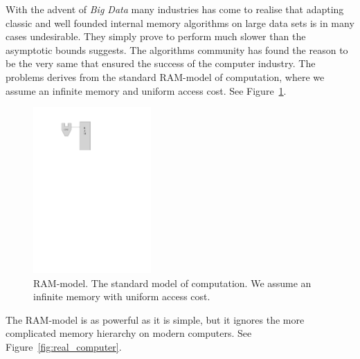 \documentclass[twoside,11pt,openright]{report}
\begin{document}
With the advent of \textit{Big Data} many industries has come to realise that adapting classic and well founded internal memory algorithms on large data sets is in many cases undesirable. 
They simply prove to perform much slower than the asymptotic bounds suggests. The algorithms community has found the reason to be the very same that ensured the success of the computer industry. The problems derives from the standard RAM-model of computation, where we assume an infinite memory and uniform access cost. See Figure~\ref{fig:ram_model}.

\begin{figure}
\captionsetup{width=0.40\textwidth}
	\centering
		\includegraphics[width=0.4\textwidth]{../figures/ram_model}
	\caption{RAM-model. The standard model of computation. We assume an infinite memory with uniform access cost.}
	\label{fig:ram_model}
\end{figure}

The RAM-model is as powerful as it is simple, but it ignores the more complicated memory hierarchy on modern computers. See Figure~\ref{fig:real_computer}. 
\end{document}
